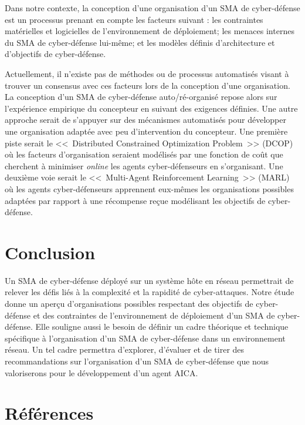 \documentclass[conference]{IEEEtran}
\begin{document}
Dans notre contexte, la conception d'une organisation d'un SMA de cyber-défense est un processus prenant en compte les facteurs suivant : les contraintes matérielles et logicielles de l'environnement de déploiement; 
les menaces internes du SMA de cyber-défense lui-même; et les modèles définis d'architecture et d'objectifs de cyber-défense.

Actuellement, il n'existe pas de méthodes ou de processus automatisés visant à trouver un consensus avec ces facteurs lors de la conception d'une organisation. 
La conception d'un SMA de cyber-défense auto/ré-organisé repose alors sur l'expérience empirique du concepteur en suivant des exigences définies.
Une autre approche serait de s'appuyer sur des mécanismes automatisés pour développer une organisation adaptée avec peu d'intervention du concepteur. 
Une première piste serait le <<~Distributed Constrained Optimization Problem~>> (DCOP) où les facteurs d'organisation seraient modélisés par une fonction de coût que cherchent à minimiser \textit{online} les agents cyber-défenseurs en s'organisant. Une deuxième voie serait le <<~Multi-Agent Reinforcement Learning~>> (MARL) où les agents cyber-défenseurs apprennent eux-mêmes les organisations possibles adaptées par rapport à une récompense reçue modélisant les objectifs de cyber-défense.

\section{Conclusion}
Un SMA de cyber-défense déployé sur un système hôte en réseau permettrait de relever les défis liés à la complexité et la rapidité de cyber-attaques. Notre étude donne un aperçu d'organisations possibles respectant des objectifs de cyber-défense et des contraintes de l'environnement de déploiement d'un SMA de cyber-défense.
Elle souligne aussi le besoin de définir un cadre théorique et technique spécifique à l'organisation d'un SMA de cyber-défense dans un environnement réseau. Un tel cadre permettra d'explorer, d'évaluer et de tirer des recommandations sur l'organisation d'un SMA de cyber-défense que nous valoriserons pour le développement d'un agent AICA.

\section*{Références}


%


\end{document}
